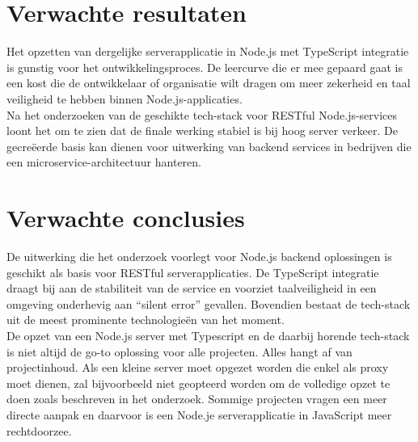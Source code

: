 \section{Verwachte resultaten}
\label{sec:verwachte_resultaten}

Het opzetten van dergelijke serverapplicatie in Node.js met TypeScript integratie is gunstig voor het ontwikkelingsproces. De leercurve die er mee gepaard gaat is een kost die de ontwikkelaar of organisatie wilt dragen om meer zekerheid en taal veiligheid te hebben binnen Node.js-applicaties. \\
Na het onderzoeken van de geschikte tech-stack voor RESTful Node.js-services loont het om te zien dat de finale werking stabiel is bij hoog server verkeer. De gecreëerde basis kan dienen voor uitwerking van backend services in bedrijven die een microservice-architectuur hanteren.

\section{Verwachte conclusies}
\label{sec:verwachte_conclusies}

De uitwerking die het onderzoek voorlegt voor Node.js backend oplossingen is geschikt als basis voor RESTful serverapplicaties. De TypeScript integratie draagt bij aan de stabiliteit van de service en voorziet taalveiligheid in een omgeving onderhevig aan ``silent error'' gevallen. Bovendien bestaat de tech-stack uit de meest prominente technologieën van het moment. \\
De opzet van een Node.js server met Typescript en de daarbij horende tech-stack is niet altijd de go-to oplossing voor alle projecten. Alles hangt af van projectinhoud. Als een kleine server moet opgezet worden die enkel als proxy moet dienen, zal bijvoorbeeld niet geopteerd worden om de volledige opzet te doen zoals beschreven in het onderzoek. Sommige projecten vragen een meer directe aanpak en daarvoor is een Node.je serverapplicatie in JavaScript meer rechtdoorzee.

